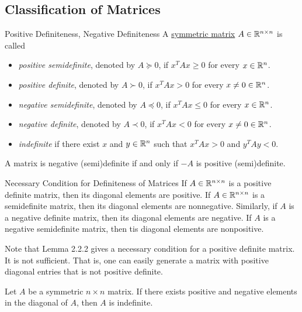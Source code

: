 \subsection{Classification of Matrices}
\begin{df}{Positive Definiteness, Negative Definiteness}
	A \underline{symmetric matrix} $A\in{\mathbb{R}}^{n\times n}$	 is called 
	\begin{itemize}
		\item \textit{positive semidefinite}, denoted by $A\succeq0$, if $x^TAx\geq0$ for every $x\in{\mathbb{R}}^n$.
		\item \textit{positive definite}, denoted by $A\succ0$, if $x^TAx>0$ for every $x\neq0\in{\mathbb{R}}^n$.
		\item \textit{negative semidefinite}, denoted by $A\preceq0$, if $x^TAx\leq0$ for every $x\in{\mathbb{R}}^n$.
		\item \textit{negative definite}, denoted by $A\prec0$, if $x^TAx<0$ for every $x\neq0\in{\mathbb{R}}^n$.
		\item \textit{indefinite} if there exist $x$ and $y\in{\mathbb{R}}^n$ such that $x^TAx>0$ and $y^TAy<0$.
	\end{itemize}
\end{df}
\begin{rmk}	
	A matrix is negative (semi)definite if and only if $-A$ is positive (semi)definite.
\end{rmk}
\begin{lem}{Necessary Condition for Definiteness of Matrices}
	If $A\in{\mathbb{R}}^{n\times n}$	is a positive definite matrix, then its diagonal elements are positive. If $A\in{\mathbb{R}}^{n\times n}$ is a semidefinite matrix, then its diagonal elements are nonnegative. Similarly, if $A$ is a negative definite matrix, then its diagonal elements are negative. If $A$ is a negative semidefinite matrix, then tis diagonal elements are nonpositive. 
\end{lem}
\begin{rmk}
	Note that Lemma 2.2.2 gives a necessary condition for a positive definite matrix. It is not sufficient. That is, one can easily generate a matrix with positive diagonal entries that is not positive definite. 	
\end{rmk}
\begin{lem}{}
	Let $A$ be a symmetric $n\times n$ matrix. If there exists positive and negative elements in the diagonal of $A$, then $A$ is indefinite. 
\end{lem}

